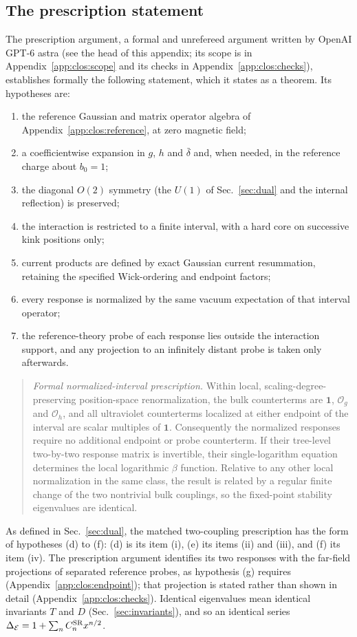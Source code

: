 \documentclass[11pt,a4paper]{article}
\numberwithin{equation}{section}
\newcommand{\De}{\Delta_{\mathcal E}}
\newcommand{\CSR}{C^{\rm SR}}
\newcommand{\db}{\bar\delta}
\newcommand{\Og}{\mathcal O_g}
\newcommand{\Oh}{\mathcal O_h}
\begin{document}
\subsection{The prescription statement}\label{app:clos:prescription}
The prescription argument, a formal and unrefereed argument written by OpenAI GPT-6 astra (see the head of this
appendix; its scope is in Appendix~\ref{app:clos:scope} and its checks in Appendix~\ref{app:clos:checks}), establishes
formally the following statement, which it states as a theorem. Its hypotheses are:
\begin{enumerate}[label=(\alph*),leftmargin=2em]
\item the reference Gaussian and matrix operator algebra of Appendix~\ref{app:clos:reference}, at zero magnetic field;
\item a coefficientwise expansion in $g$, $h$ and $\db$ and, when needed, in the reference charge about $b_0=1$;
\item the diagonal $O(2)$ symmetry (the $U(1)$ of Sec.~\ref{sec:dual} and the internal reflection) is preserved;
\item the interaction is restricted to a finite interval, with a hard core on successive kink positions only;
\item current products are defined by exact Gaussian current resummation, retaining the specified Wick-ordering and
 endpoint factors;
\item every response is normalized by the same vacuum expectation of that interval operator;
\item the reference-theory probe of each response lies outside the interaction support, and any projection to an
 infinitely distant probe is taken only afterwards.
\end{enumerate}
\begin{quote}
\emph{Formal normalized-interval prescription.} Within local, scaling-degree-preserving position-space
renormalization, the bulk counterterms are $\mathbf 1$, $\Og$ and $\Oh$, and all ultraviolet counterterms localized at
either endpoint of the interval are scalar multiples of $\mathbf 1$. Consequently the normalized responses require no
additional endpoint or probe counterterm. If their tree-level two-by-two response matrix is invertible, their
single-logarithm equation determines the local logarithmic $\beta$ function. Relative to any other local normalization
in the same class, the result is related by a regular finite change of the two nontrivial bulk couplings, so the
fixed-point stability eigenvalues are identical.
\end{quote}
As defined in Sec.~\ref{sec:dual}, the matched two-coupling prescription has the form of hypotheses (d) to (f): (d)
is its item (i), (e) its items (ii) and (iii), and (f) its item (iv). The prescription argument identifies its two
responses with the far-field projections of separated reference probes, as hypothesis (g) requires
(Appendix~\ref{app:clos:endpoint}); that projection is stated rather than shown in detail
(Appendix~\ref{app:clos:checks}). Identical
eigenvalues mean identical invariants $T$ and $D$ (Sec.~\ref{sec:invariants}), and so an identical series
$\De=1+\sum_n\CSR_nx^{n/2}$.
\end{document}
